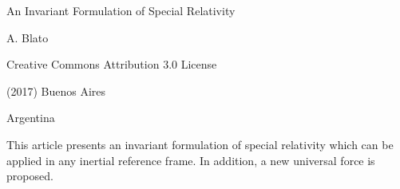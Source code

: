 \documentclass[10pt,fleqn]{article}
\begin{document}
\begin{center}

{\fontsize{9.96}{9.96}\selectfont \sc An Invariant Formulation of Special Relativity}

\bigskip \medskip

{\fontsize{9.60}{9.60}\selectfont A. Blato}

\bigskip \medskip

\small

Creative Commons Attribution 3.0 License

\smallskip

(2017) Buenos Aires

\medskip

Argentina

\smallskip

\bigskip \medskip

\parbox{83.40mm}{This article presents an invariant formulation of special relativity which can be applied in any inertial reference frame. In addition, a new universal force is proposed.}

\end{center}

\normalsize

\vspace{-1.50em}

\par {}

\bigskip \smallskip
\end{document}
